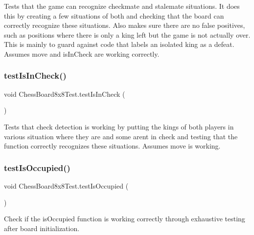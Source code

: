 Tests that the game can recognize checkmate and stalemate situations. It does this by creating a few situations of both and checking that the board can correctly recognize these situations. Also makes sure there are no false positives, such as positions where there is only a king left but the game is not actually over. This is mainly to guard against code that labels an isolated king as a defeat. Assumes \textquotesingle{}move\textquotesingle{} and \textquotesingle{}is\+In\+Check\textquotesingle{} are working correctly. \mbox{\label{class_chess_board8x8_test_a8732515f549e0ea68a0da19682eb9459}} 
\subsubsection{\texorpdfstring{test\+Is\+In\+Check()}{testIsInCheck()}}
{\footnotesize\ttfamily void Chess\+Board8x8\+Test.\+test\+Is\+In\+Check (\begin{DoxyParamCaption}{ }\end{DoxyParamCaption})}

Tests that check detection is working by putting the kings of both players in various situation where they are and some aren\textquotesingle{}t in check and testing that the function correctly recognizes these situations. Assumes \textquotesingle{}move\textquotesingle{} is working. \mbox{\label{class_chess_board8x8_test_aa806b2ef91d514dc4512a5d83d589793}} 
\subsubsection{\texorpdfstring{test\+Is\+Occupied()}{testIsOccupied()}}
{\footnotesize\ttfamily void Chess\+Board8x8\+Test.\+test\+Is\+Occupied (\begin{DoxyParamCaption}{ }\end{DoxyParamCaption})}

Check if the is\+Occupied function is working correctly through exhaustive testing after board initialization. \mbox{\label{class_chess_board8x8_test_a618b9e28857d806c997a95b460af6096}} 
